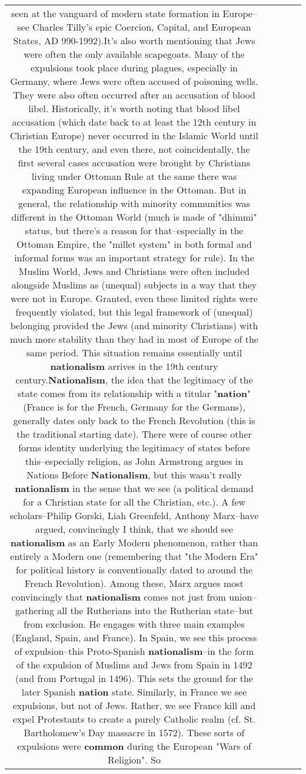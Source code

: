 \documentclass[11pt]{article}
\newlength\mylength
\begin{document}
\begin{center}
\begin{longtable}{|C{.65\mylength}|C{.30\mylength}|C{.12\mylength}|C{.12\mylength}|C{.12\mylength}|}
seen at the vanguard of modern state formation in Europe--see Charles Tilly's epic Coercion, Capital, and European States, AD 990-1992).It's also worth mentioning that Jews were often the only available scapegoats. Many of the expulsions took place during plagues, especially in Germany, where Jews were often accused of poisoning wells. They were also often occurred after an accusation of blood libel. Historically, it's worth noting that blood libel accusation (which date back to at least the 12th century in Christian Europe) never occurred in the Islamic World until the 19th century, and even there, not coincidentally, the first several cases accusation were brought by Christians living under Ottoman Rule at the same there was expanding European influence in the Ottoman. But in general, the relationship with minority communities was different in the Ottoman World (much is made of "dhimmi" status, but there's a reason for that--especially in the Ottoman Empire, the "millet system" in both formal and informal forms was an important strategy for rule). In the Muslim World, Jews and Christians were often included alongside Muslims as (unequal) subjects in a way that they were not in Europe. Granted, even these limited rights were frequently violated, but this legal framework of (unequal) belonging provided the Jews (and minority Christians) with much more stability than they had in most of Europe of the same period. This situation remains essentially until \textbf{nationalism} arrives in the 19th century century.\textbf{Nationalism}, the idea that the legitimacy of the state comes from its relationship with a titular "\textbf{nation}" (France is for the French, Germany for the Germans), generally dates only back to the French Revolution (this is the traditional starting date). There were of course other forms identity underlying the legitimacy of states before this--especially religion, as John Armstrong argues in Nations Before \textbf{Nationalism}, but this wasn't really \textbf{nationalism} in the sense that we see (a political demand for a Christian state for all the Christian, etc.). A few scholars--Philip Gorski, Liah Greenfeld, Anthony Marx--have argued, convincingly I think, that we should see \textbf{nationalism} as an Early Modern phenomenon, rather than entirely a Modern one (remembering that "the Modern Era" for political history is conventionally dated to around the French Revolution). Among these, Marx argues most convincingly that \textbf{nationalism} comes not just from union--gathering all the Rutherians into the Rutherian state--but from exclusion. He engages with three main examples (England, Spain, and France). In Spain, we see this process of expulsion--this Proto-Spanish \textbf{nationalism}--in the form of the expulsion of Muslims and Jews from Spain in 1492 (and from Portugal in 1496). This sets the ground for the later Spanish \textbf{nation} state. Similarly, in France we see expulsions, but not of Jews. Rather, we see France kill and expel Protestants to create a purely Catholic realm (cf. St. Bartholomew's Day massacre in 1572). These sorts of expulsions were \textbf{common} during the European "Wars of Religion". So 
\end{longtable}
\end{center}
\end{document}
